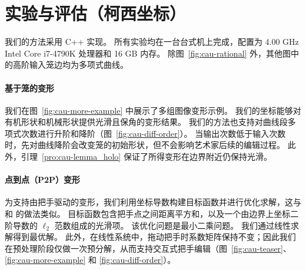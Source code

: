\section{实验与评估（柯西坐标）}\label{sec:cau-results}
我们的方法采用 C++ 实现。
所有实验均在一台台式机上完成，配置为 4.00 GHz Intel Core i7-4790K 处理器和 16 GB 内存。
%
除图~\ref{fig:cau-rational} 外，其他图中的高阶输入笼边均为多项式曲线。

\paragraph{基于笼的变形}
我们在图~\ref{fig:cau-more-example} 中展示了多组图像变形示例。
我们的坐标能够对有机形状和机械形状提供光滑且保角的变形结果。
我们的方法也支持对曲线段多项式次数进行升阶和降阶（图~\ref{fig:cau-diff-order}）。
当输出次数低于输入次数时，先对曲线降阶会改变笼的初始形状，但不会影响艺术家后续的编辑过程。
此外，引理~\ref{pro:cau-lemma_holo} 保证了所得变形在边界附近仍保持光滑。

\paragraph{点到点（P2P）变形}
为支持由把手驱动的变形，我们利用坐标导数构建目标函数并进行优化求解，这与 \cite{Weber2009} 和 \cite{Lin2024PolynomialCC} 的做法类似。
目标函数包含把手点之间距离平方和，以及一个由边界上坐标二阶导数的 $\ell_2$ 范数组成的光滑项。
%
该优化问题是最小二乘问题。
我们通过线性求解得到最优解。
此外，在线性系统中，拖动把手时系数矩阵保持不变；因此我们在预处理阶段仅做一次预分解，从而支持交互式把手编辑（图~\ref{fig:cau-teaser}、\ref{fig:cau-more-example} 和 \ref{fig:cau-diff-order}）。

